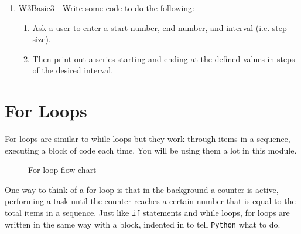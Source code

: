 \begin{enumerate}
    \item W3Basic3 - Write some code to do the following:
        \begin{enumerate}
            \item Ask a user to enter a start number, end number, and interval (i.e. step size).
            \item Then print out a series starting and ending at the defined values in steps of the desired interval.
        \end{enumerate}
\end{enumerate}

\newpage

\section{For Loops}
For loops are similar to while loops but they work through items in a sequence, executing a block of code each time. You will be using them a lot in this module.


\vspace{1cm}
\begin{figure}[H]
\begin{center}
\end{center}
\caption{For loop flow chart}
\label{fig:flfc}
\end{figure}

\noindent One way to think of a for loop is that in the background a counter is active, performing a task until the counter reaches a certain number that is equal to the total items in a sequence. Just like \texttt{if} statements and while loops, for loops are written in the same way with a block, indented in to tell \texttt{Python} what to do.\\

